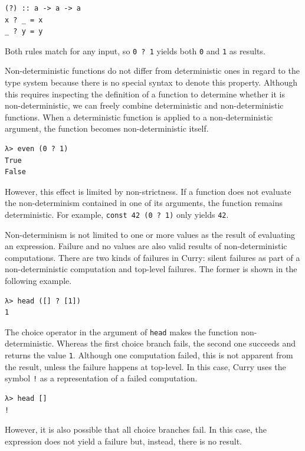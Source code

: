 \documentclass[a4paper, 11pt, fleqn, twoside]{scrreprt}
\newcommand{\hinl}[1]{\texttt{#1}}
\begin{document}
\begin{verbatim}
(?) :: a -> a -> a
x ? _ = x
_ ? y = y
\end{verbatim}

Both rules match for any input, so \hinl{0 ? 1} yields both \hinl{0} and \hinl{1} as results.

Non-deterministic functions do not differ from deterministic ones in regard to the type system because there is no special syntax to denote this property.
Although this requires inspecting the definition of a function to determine whether it is non-deterministic, we can freely combine deterministic and non-deterministic functions.
When a deterministic function is applied to a non-deterministic argument, the function becomes non-deterministic itself.

\begin{verbatim}
λ> even (0 ? 1)
True
False
\end{verbatim}

However, this effect is limited by non-strictness.
If a function does not evaluate the non-determinism contained in one of its arguments, the function remains deterministic.
For example, \hinl{const 42 (0 ? 1)} only yields \hinl{42}.

Non-determinism is not limited to one or more values as the result of evaluating an expression.
Failure and no values are also valid results of non-deterministic computations.
There are two kinds of failures in Curry: silent failures as part of a non-deterministic computation and top-level failures.
The former is shown in the following example.

\begin{verbatim}
λ> head ([] ? [1])
1
\end{verbatim}

The choice operator in the argument of \hinl{head} makes the function non-deterministic.
Whereas the first choice branch fails, the second one succeeds and returns the value \hinl{1}.
Although one computation failed, this is not apparent from the result, unless the failure happens at top-level.
In this case, Curry uses the symbol \hinl{!} as a representation of a failed computation.

\begin{verbatim}
λ> head []
!
\end{verbatim}

However, it is also possible that all choice branches fail.
In this case, the expression does not yield a failure but, instead, there is no result.
\end{document}
